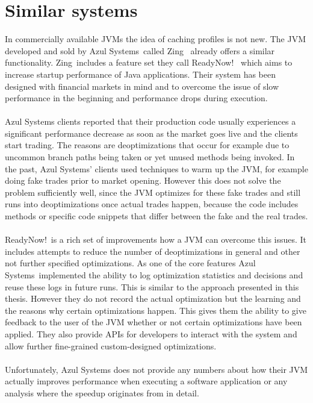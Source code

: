 \section{Similar systems}
\label{s:similarsystems}
In commercially available JVMs the idea of caching profiles is not new.
The JVM developed and sold by Azul Systems\textregistered\ called Zing\textregistered\ \cite{zing} already offers a similar functionality.
Zing\textregistered\ includes a feature set they call ReadyNow!\texttrademark\ \cite{readynow} which aims to increase startup performance of Java applications.
Their system has been designed with financial markets in mind and to overcome the issue of slow performance in the beginning and performance drops during execution.
\\\\
Azul Systems clients reported that their production code usually experiences a significant performance decrease as soon as the market goes live and the clients start trading.
The reasons are deoptimizations that occur for example due to uncommon branch paths being taken or yet unused methods being invoked.
In the past, Azul Systems' clients used techniques to warm up the JVM, for example doing fake trades prior to market opening. However this does not solve the problem sufficiently well, since the JVM optimizes for these fake trades and still runs into deoptimizations once actual trades happen, because the code includes methods or specific code snippets that differ between the fake and the real trades.
\\\\
ReadyNow!\texttrademark\ is a rich set of improvements how a JVM can overcome this issues. It includes attempts to reduce the number of deoptimizations in general and other not further specified optimizations.
As one of the core features Azul Systems\textregistered\ implemented the ability to log optimization statistics and decisions and reuse these logs in future runs. This is similar to the approach presented in this thesis. However they do not record the actual optimization but the learning and the reasons why certain optimizations happen. This gives them the ability to give feedback to the user of the JVM whether or not certain optimizations have been applied. They also provide APIs for developers to interact with the system and allow further fine-grained custom-designed optimizations.
\\\\
Unfortunately, Azul Systems does not provide any numbers about how their JVM actually improves performance when executing a software application or any analysis where the speedup originates from in detail.
